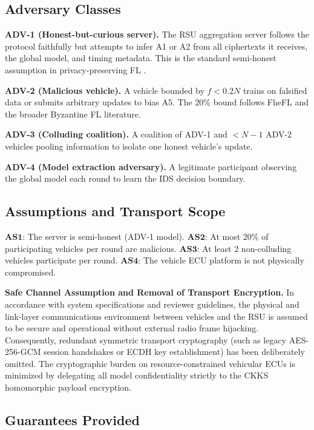 \documentclass[conference]{IEEEtran}
\begin{document}
\subsection{Adversary Classes}

\textbf{ADV-1 (Honest-but-curious server).}
The RSU aggregation server follows the protocol faithfully but attempts to
infer A1 or A2 from all ciphertexts it receives, the global model, and
timing metadata. This is the standard semi-honest assumption in
privacy-preserving FL \cite{bonawitz2017practical}.

\textbf{ADV-2 (Malicious vehicle).}
A vehicle bounded by $f < 0.2N$ trains on falsified data or submits
arbitrary updates to bias A5. The $20\%$ bound follows FheFL \cite{fhefl2023}
and the broader Byzantine FL literature.

\textbf{ADV-3 (Colluding coalition).}
A coalition of ADV-1 and $< N{-}1$ ADV-2 vehicles pooling information to
isolate one honest vehicle's update.

\textbf{ADV-4 (Model extraction adversary).}
A legitimate participant observing the global model each round to learn the
IDS decision boundary.

\subsection{Assumptions and Transport Scope}

$\mathbf{AS1}$: The server is semi-honest (ADV-1 model).
$\mathbf{AS2}$: At most $20\%$ of participating vehicles per round are
malicious.
$\mathbf{AS3}$: At least 2 non-colluding vehicles participate per round.
$\mathbf{AS4}$: The vehicle ECU platform is not physically compromised.

\textbf{Safe Channel Assumption and Removal of Transport Encryption.}
In accordance with system specifications and reviewer guidelines, the physical
and link-layer communications environment between vehicles and the RSU is
assumed to be secure and operational without external radio frame hijacking.
Consequently, redundant symmetric transport cryptography (such as legacy
AES-256-GCM session handshakes or ECDH key establishment) has been deliberately
omitted. The cryptographic burden on resource-constrained vehicular ECUs is
minimized by delegating all model confidentiality strictly to the CKKS
homomorphic payload encryption.

\subsection{Guarantees Provided}
\end{document}
